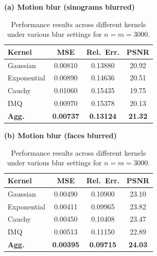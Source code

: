 \documentclass[twoside,11pt]{article}
\begin{document}
\begin{table}[t]
\centering
\caption{Performance results across different kernels under various blur settings for $n=m=3000$.}
\label{tab:kernel_performance}
\small
\renewcommand{\arraystretch}{1.2}

\begin{minipage}[t]{0.47\textwidth}
\centering
\textbf{(a) Motion blur (sinograms blurred)}\\[0.3em]
\begin{tabular}{lccc}
\toprule
Kernel & MSE & Rel.\ Err. & PSNR \\
\midrule
Gaussian     & 0.00810 & 0.13880 & 20.92 \\
Exponential  & 0.00890 & 0.14636 & 20.51 \\
Cauchy       & 0.01060 & 0.15435 & 19.75 \\
IMQ          & 0.00970 & 0.15378 & 20.13 \\
\midrule
\textbf{Agg.} & \textbf{0.00737} & \textbf{0.13124} & \textbf{21.32} \\
\bottomrule
\end{tabular}
\end{minipage}
\hfill
\begin{minipage}[t]{0.47\textwidth}
\centering
\textbf{(b) Motion blur (faces blurred)}\\[0.3em]
\begin{tabular}{lccc}
\toprule
Kernel & MSE & Rel.\ Err. & PSNR \\
\midrule
Gaussian     & 0.00490 & 0.10900 & 23.10 \\
Exponential  & 0.00411 & 0.09965 & 23.82 \\
Cauchy       & 0.00450 & 0.10408 & 23.47 \\
IMQ          & 0.00513 & 0.11150 & 22.89 \\
\midrule
\textbf{Agg.} & \textbf{0.00395} & \textbf{0.09715} & \textbf{24.03} \\
\bottomrule
\end{tabular}
\end{minipage}

\vspace{0.8em}


\end{table}
\end{document}

